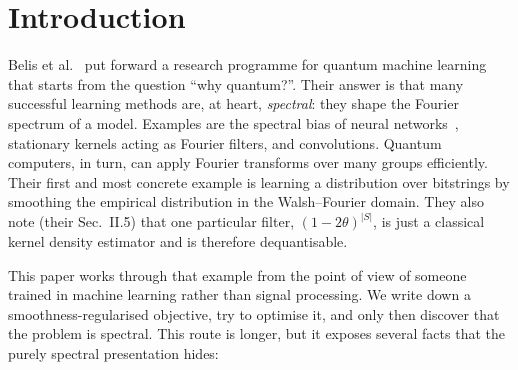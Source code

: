 \documentclass[11pt]{article}
\theoremstyle{definition}
\theoremstyle{remark}
\begin{document}
\section{Introduction}

Belis et al.~\cite{belis2026spectral} put forward a research programme for quantum machine learning that starts from the question ``why quantum?''. Their answer is that many successful learning methods are, at heart, \emph{spectral}: they shape the Fourier spectrum of a model. Examples are the spectral bias of neural networks~\cite{rahaman2019spectral}, stationary kernels acting as Fourier filters, and convolutions. Quantum computers, in turn, can apply Fourier transforms over many groups efficiently. Their first and most concrete example is learning a distribution over bitstrings by smoothing the empirical distribution in the Walsh--Fourier domain. They also note (their Sec.~II.5) that one particular filter, $(1-2\theta)^{|S|}$, is just a classical kernel density estimator and is therefore dequantisable.

This paper works through that example from the point of view of someone trained in machine learning rather than signal processing. We write down a smoothness-regularised objective, try to optimise it, and only then discover that the problem is spectral. This route is longer, but it exposes several facts that the purely spectral presentation hides:
\end{document}
